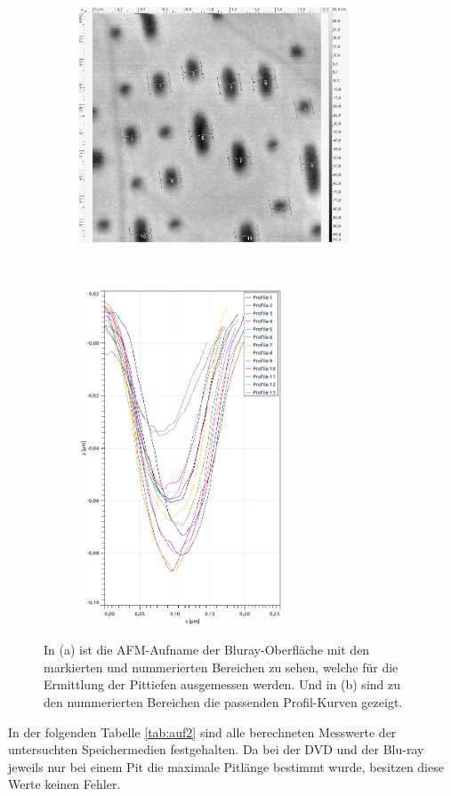 \begin{figure}[H]
\centering
	\begin{subfigure}[t]{0.45\textwidth}
	\includegraphics[height=7cm]{AFM_auswertung/bluray_tiefe.png}
	\caption{}
	\end{subfigure}
	~
	\begin{subfigure}[t]{0.45\textwidth}
	\includegraphics[height=10cm]{AFM_auswertung/bluray_tiefe_grafik.png}
	\caption{}
	\label{abb:br_tiefe}
	\end{subfigure}
\caption{In (a) ist die AFM-Aufname der Bluray-Oberfl\"ache mit den markierten und nummerierten Bereichen zu sehen, welche f\"ur die Ermittlung der Pittiefen ausgemessen werden. Und in (b) sind zu den nummerierten Bereichen die passenden Profil-Kurven gezeigt.}
\label{abb:pit_tiefe_br}
\end{figure}
In der folgenden Tabelle \ref{tab:auf2} sind alle berechneten Messwerte der untersuchten Speicher{\-}medien festgehalten.
Da bei der DVD und der Blu-ray jeweils nur bei einem Pit die maximale Pitl\"ange bestimmt wurde, besitzen diese Werte keinen Fehler.
